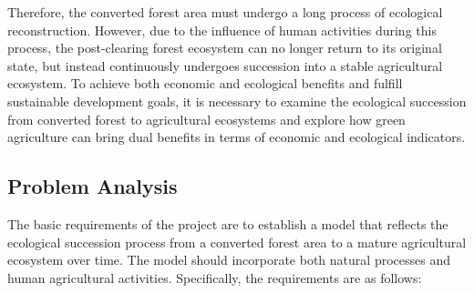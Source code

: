 \documentclass{HZNUMCM}
\begin{document}
    Therefore, the converted forest area must undergo a long process of ecological reconstruction. 
    However, due to the influence of human activities during this process, 
    the post-clearing forest ecosystem can no longer return to its original state, 
    but instead continuously undergoes succession into a stable agricultural ecosystem. 
    To achieve both economic and ecological benefits and fulfill sustainable development goals, 
    it is necessary to examine the ecological succession from converted forest to agricultural ecosystems and explore how green agriculture can bring dual benefits in terms of economic and ecological indicators.
    \subsection{Problem Analysis}
      The basic requirements of the project are to establish a model that reflects the ecological succession process from a converted forest area to a mature agricultural ecosystem over time. 
      The model should incorporate both natural processes and human agricultural activities. 
      Specifically, the requirements are as follows:
\end{document}
